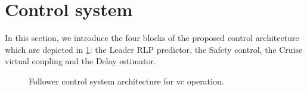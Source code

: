 		
		
		
		
		
		

		
\section{Control system}
\label{sec:controlsystem}

\begin{comment}
	\textcolor{red}{Mettere qui la parte di descrizione dell'archiettura di controllo. Questa parte va aggiustata e uniformata a quello che segue. Eviterei nomi troppo pomposi. L'architettura di controllo comprende: leader RLP predictor block, safety control block, cruise virtual coupling control block (che noi ipotizziamo come switching a livelli). Questi tre blocchi sono studiati in tre diverse sezioni del paper. Qui si dà un'introduzione generale all'architettura. Questo pezzo va quindi riscritto secondo quanto sviluppato nel seguito.} 
\end{comment}


In this section, we introduce the four blocks of the proposed control architecture which are depicted in \ref{fig:controlSystem}: the Leader RLP predictor, the Safety control, the Cruise virtual coupling and the Delay estimator.


\begin{figure}[H]
	\resizebox{\linewidth}{!}{}
	\caption{Follower control system architecture for \gls{vc} operation. }
	\label{fig:controlSystem}
\end{figure}

